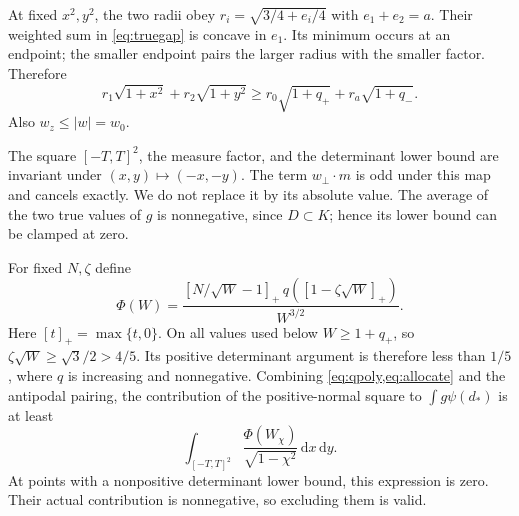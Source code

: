 \documentclass[11pt]{article}
\numberwithin{equation}{section}
\theoremstyle{definition}\newtheorem{definition}[theorem]{Definition}
\theoremstyle{remark}\newtheorem{remark}[theorem]{Remark}
\newcommand{\dd}{\,\mathrm d}
\newcommand{\pp}[1]{[#1]_+}
\begin{document}
At fixed $x^2,y^2$, the two radii obey $r_i=\sqrt{3/4+e_i/4}$ with
$e_1+e_2=a$. Their weighted sum in \cref{eq:truegap} is concave in $e_1$.
Its minimum occurs at an endpoint; the smaller endpoint pairs the larger
radius with the smaller factor. Therefore
\begin{equation}\label{eq:allocate}
 r_1\sqrt{1+x^2}+r_2\sqrt{1+y^2}
 \ge r_0\sqrt{1+q_+}+r_a\sqrt{1+q_-}.
\end{equation}
Also $w_z\le|w|=w_0$.

The square $[-T,T]^2$, the measure factor, and the determinant lower bound
are invariant under $(x,y)\mapsto(-x,-y)$. The term $w_\perp\cdot m$ is
odd under this map and cancels exactly. We do not replace it by its absolute
value. The average of the two true values of $g$ is nonnegative, since
$D\subset K$; hence its lower bound can be clamped at zero.

For fixed $N,\zeta$ define
\begin{equation}\label{eq:Phi}
 \Phi(W)=\frac{\pp{N/\sqrt W-1}\,
 q(\pp{1-\zeta\sqrt W})}{W^{3/2}}.
\end{equation}
Here $[t]_+=\max\{t,0\}$. On all values used below $W\ge1+q_+$, so
$\zeta\sqrt W\ge\sqrt3/2>4/5$. Its positive determinant argument is
therefore less than $1/5$, where $q$ is increasing and nonnegative.
Combining \cref{eq:qpoly,eq:allocate} and the antipodal pairing, the
contribution of the positive-normal square to $\int g\psi(d_*)$ is at least
\begin{equation}\label{eq:localintegral}
 \int_{[-T,T]^2}\frac{\Phi(W_\chi)}{\sqrt{1-\chi^2}}\dd x\dd y.
\end{equation}
At points with a nonpositive determinant lower bound, this expression is
zero. Their actual contribution is nonnegative, so excluding them is valid.
\end{document}
